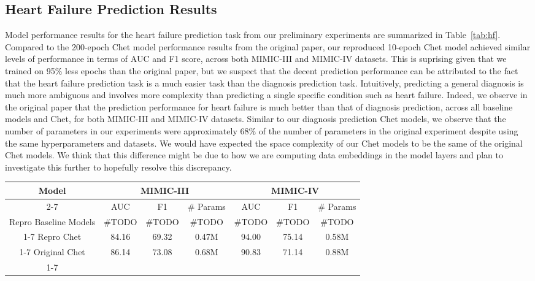 \documentclass[11pt,a4paper,fleqn]{article}
\begin{document}
\subsection{Heart Failure Prediction Results}
Model performance results for the heart failure prediction task from our preliminary experiments are summarized in Table~\ref{tab:hf}. 
Compared to the 200-epoch Chet model performance results from the original paper, our reproduced 10-epoch Chet 
model achieved similar levels of performance in terms of AUC and F1 score, across both MIMIC-III and MIMIC-IV datasets.
This is suprising given that we trained on 95\% less epochs than the original paper, but we suspect that the decent prediction performance 
can be attributed to the fact that the heart failure prediction task is a much easier task than the diagnosis prediction task. Intuitively, 
predicting a general diagnosis is much more ambiguous and involves more complexity than predicting a single specific condition such as heart failure. 
Indeed, we observe in the original paper that the prediction performance for heart failure is much better than that of diagnosis prediction, across all 
baseline models and Chet, for both MIMIC-III and MIMIC-IV datasets.
Similar to our diagnosis prediction Chet models, we observe that the number of parameters in our experiments were approximately 68\% of the number of parameters in the 
original experiment despite using the same hyperparameters and datasets. We would have expected the space complexity of our Chet models to be 
the same of the original Chet models. We think that this difference might be due to how we are computing data embeddings in the model layers 
and plan to investigate this further to hopefully resolve this discrepancy.
\begin{table*}[ht]
\centering
\begin{tabular}{|c|c|c|c|c|c|c|}
\hline
{Model} & \multicolumn{3}{c|}{MIMIC-III} & \multicolumn{3}{c|}{MIMIC-IV} \\ \cline{2-7} 
 & AUC & F1 & \# Params & AUC & F1 & \# Params \\ \hline
{Repro Baseline Models} & \#TODO & \#TODO & \#TODO & \#TODO & \#TODO & \#TODO \\ \cline{1-7}
{Repro Chet} & 84.16 & 69.32 & 0.47M & 94.00 & 75.14 & 0.58M \\ \cline{1-7}
{Original Chet} & 86.14 & 73.08 & 0.68M & 90.83 & 71.14 & 0.88M \\ \cline{1-7}
\end{tabular}
\caption{Heart failure prediction results on MIMIC-III and MIMIC-IV using AUC (\%) and F1 (\%).}
\label{tab:hf}
\end{table*}
\end{document}
